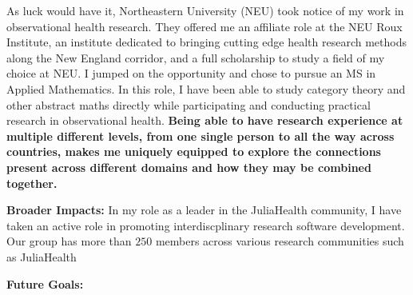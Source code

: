 \documentclass[11pt]{extarticle}
\begin{document}
As luck would have it, Northeastern University (NEU) took notice of my work in observational health research.
They offered me an affiliate role at the NEU Roux Institute, an institute dedicated to bringing cutting edge health research methods along the New England corridor, and a full scholarship to study a field of my choice at NEU.
I jumped on the opportunity and chose to pursue an MS in Applied Mathematics.
In this role, I have been able to study category theory and other abstract maths directly while participating and conducting practical research in observational health.
\textbf{Being able to have research experience at multiple different levels, from one single person to all the way across countries, makes me uniquely equipped to explore the connections present across different domains and how they may be combined together.}

\textbf{Broader Impacts:} In my role as a leader in the JuliaHealth community, I have taken an active role in promoting interdiscplinary research software development. Our group has more than $250$ members  across various research communities such as JuliaHealth 

\textbf{Future Goals:} 
\end{document}
